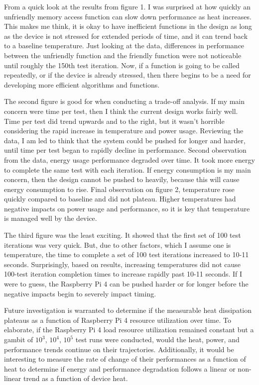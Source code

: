 \documentclass[journal]{IEEEtran}
\begin{document}
    From a quick look at the results from figure 1. I was surprised at how quickly an unfriendly memory access function can slow down performance as heat increases. 
    This makes me think, it is okay to have inefficient functions in the design as long as the device is not stressed for extended periods of time, and it can trend back to a baseline temperature.
    Just looking at the data, differences in performance between the unfriendly function and the friendly function were not noticeable until roughly the 150th test iteration.
    Now, if a function is going to be called repeatedly, or if the device is already stressed, then there begins to be a need for developing more efficient algorithms and functions.

    The second figure is good for when conducting a trade-off analysis. If my main concern were time per test, then I think the current design works fairly well. 
    Time per test did trend upwards and to the right, but it wasn't horrible considering the rapid increase in temperature and power usage.
    Reviewing the data, I am led to think that the system could be pushed for longer and harder, until time per test began to rapidly decline in performance.
    Second observation from the data, energy usage performance degraded over time. It took more energy to complete the same test with each iteration.
    If energy consumption is my main concern, then the design cannot be pushed to heavily, because this will cause energy consumption to rise.
    Final observation on figure 2, temperature rose quickly compared to baseline and did not plateau. 
    Higher temperatures had negative impacts on power usage and performance, so it is key that temperature is managed well by the device.

    The third figure was the least exciting. It showed that the first set of 100 test iterations was very quick. 
    But, due to other factors, which I assume one is temperature, the time to complete a set of 100 test iterations increased to 10-11 seconds.
    Surprisingly, based on results, increasing temperatures did not cause 100-test iteration completion times to increase rapidly past 10-11 seconds.
    If I were to guess, the Raspberry Pi 4 can be pushed harder or for longer before the negative impacts begin to severely impact timing. 

    Future investigation is warranted to determine if the measurable heat dissipation plateaus as a function of Raspberry Pi 4 resource utilization over time. 
    To elaborate, if the Raspberry Pi 4 load resource utilization remained constant but a gambit of $10^{3}$, $10^{4}$, $10^{5}$ test runs were conducted, would the heat, power, and performance trends continue on their trajectories. 
    Additionally, it would be interesting to measure the rate of change of their performances as a function of heat to determine if energy and performance degradation follows a linear or non-linear trend as a function of device heat.
\end{document}
